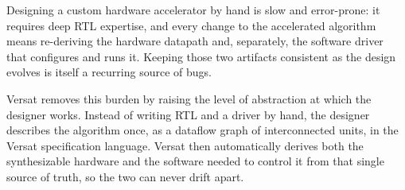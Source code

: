 %

Designing a custom hardware accelerator by hand is slow and error-prone: it
requires deep RTL expertise, and every change to the accelerated algorithm
means re-deriving the hardware datapath and, separately, the software
driver that configures and runs it. Keeping those two artifacts consistent
as the design evolves is itself a recurring source of bugs.

Versat removes this burden by raising the level of abstraction at which the
designer works. Instead of writing RTL and a driver by hand, the designer
describes the algorithm once, as a dataflow graph of interconnected units,
in the Versat specification language. Versat then automatically derives
both the synthesizable hardware and the software needed to control it from
that single source of truth, so the two can never drift apart.
